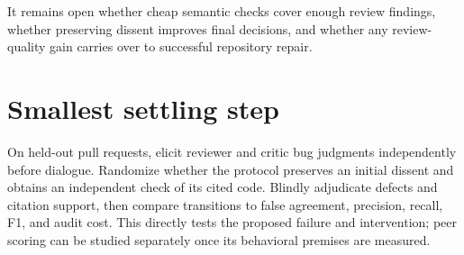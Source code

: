 \documentclass{article}
\begin{document}
It remains open whether cheap semantic checks cover enough review findings, whether preserving dissent improves final decisions, and whether any review-quality gain carries over to successful repository repair. 

\section*{Smallest settling step}

On held-out pull requests, elicit reviewer and critic bug judgments independently before dialogue. Randomize whether the protocol preserves an initial dissent and obtains an independent check of its cited code. Blindly adjudicate defects and citation support, then compare transitions to false agreement, precision, recall, F1, and audit cost. This directly tests the proposed failure and intervention; peer scoring can be studied separately once its behavioral premises are measured. 
\end{document}
